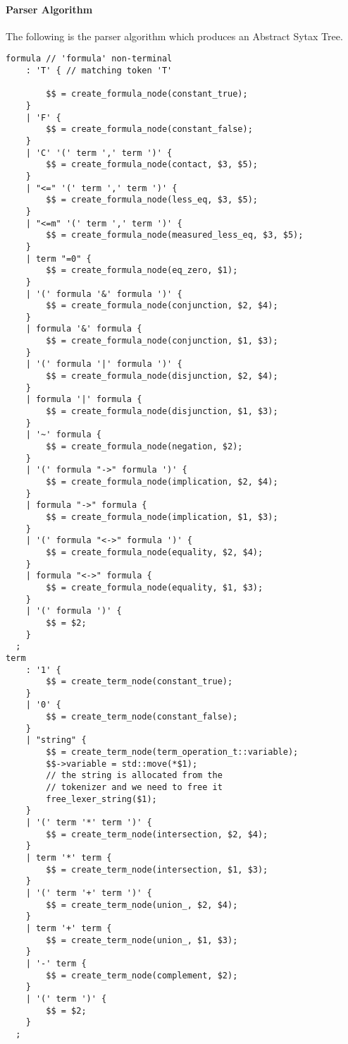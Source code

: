 \documentclass{article}
\begin{document}
		\paragraph{Parser Algorithm} The following is the parser algorithm which produces an Abstract Sytax Tree. 

		\begin{lstlisting}
formula // 'formula' non-terminal
    : 'T' { // matching token 'T'
        
        $$ = create_formula_node(constant_true);   
    }
    | 'F' {
        $$ = create_formula_node(constant_false);
    }
    | 'C' '(' term ',' term ')' {
        $$ = create_formula_node(contact, $3, $5); 
    }
    | "<=" '(' term ',' term ')' {
        $$ = create_formula_node(less_eq, $3, $5);
    }
    | "<=m" '(' term ',' term ')' {
        $$ = create_formula_node(measured_less_eq, $3, $5);
    }
    | term "=0" {
        $$ = create_formula_node(eq_zero, $1);
    }
    | '(' formula '&' formula ')' {
        $$ = create_formula_node(conjunction, $2, $4);
    }
    | formula '&' formula {
        $$ = create_formula_node(conjunction, $1, $3);
    }
    | '(' formula '|' formula ')' {
        $$ = create_formula_node(disjunction, $2, $4);
    }
    | formula '|' formula {
        $$ = create_formula_node(disjunction, $1, $3);
    }
    | '~' formula {
        $$ = create_formula_node(negation, $2);
    }
    | '(' formula "->" formula ')' {
        $$ = create_formula_node(implication, $2, $4);
    }
    | formula "->" formula {
        $$ = create_formula_node(implication, $1, $3);
    }
    | '(' formula "<->" formula ')' {
        $$ = create_formula_node(equality, $2, $4);
    }
    | formula "<->" formula {
        $$ = create_formula_node(equality, $1, $3);
    }
    | '(' formula ')' {
        $$ = $2;
    }
  ;
term
    : '1' {
        $$ = create_term_node(constant_true);
    }
    | '0' {
        $$ = create_term_node(constant_false);
    }
    | "string" {
        $$ = create_term_node(term_operation_t::variable);
        $$->variable = std::move(*$1);
        // the string is allocated from the
        // tokenizer and we need to free it
        free_lexer_string($1); 
    }
    | '(' term '*' term ')' {
        $$ = create_term_node(intersection, $2, $4);
    }
    | term '*' term {
        $$ = create_term_node(intersection, $1, $3);
    }
    | '(' term '+' term ')' {
        $$ = create_term_node(union_, $2, $4);
    }
    | term '+' term {
        $$ = create_term_node(union_, $1, $3);
    }
    | '-' term {
        $$ = create_term_node(complement, $2);
    }
    | '(' term ')' {
        $$ = $2;
    }
  ;
		\end{lstlisting}
\end{document}
